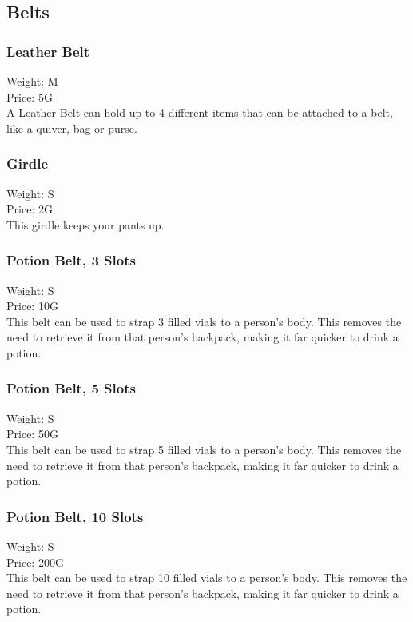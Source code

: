 \subsection{Belts}

\subsubsection{Leather Belt}
Weight: M\\
Price: 5G\\
A Leather Belt can hold up to 4 different items that can be attached to a belt, like a quiver, bag or purse.

\subsubsection{Girdle}
Weight: S\\
Price: 2G\\
This girdle keeps your pants up.

\subsubsection{Potion Belt, 3 Slots}
Weight: S\\
Price: 10G\\
This belt can be used to strap 3 filled vials to a person's body.
This removes the need to retrieve it from that person's backpack, making it far quicker to drink a potion.

\subsubsection{Potion Belt, 5 Slots}
Weight: S\\
Price: 50G\\
This belt can be used to strap 5 filled vials to a person's body.
This removes the need to retrieve it from that person's backpack, making it far quicker to drink a potion.

\subsubsection{Potion Belt, 10 Slots}
Weight: S\\
Price: 200G\\
This belt can be used to strap 10 filled vials to a person's body.
This removes the need to retrieve it from that person's backpack, making it far quicker to drink a potion.



